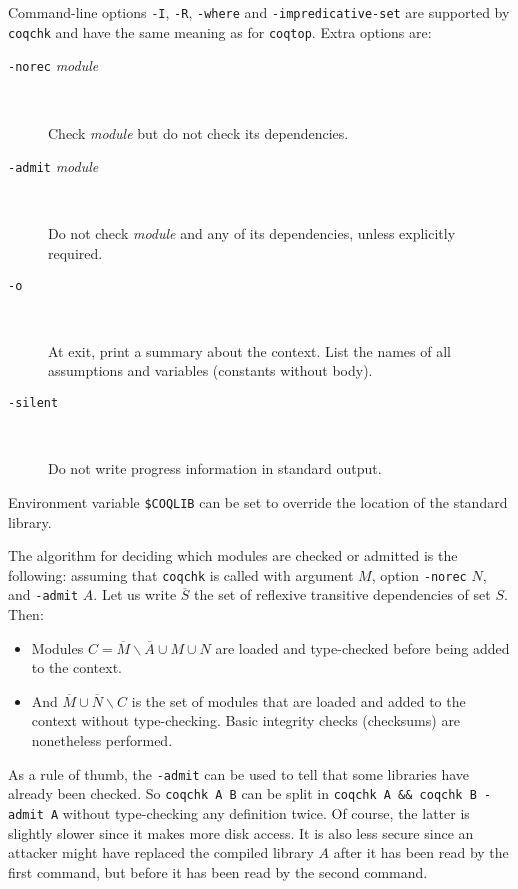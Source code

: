 Command-line options {\tt -I}, {\tt -R}, {\tt -where} and
{\tt -impredicative-set} are supported by {\tt coqchk} and have the
same meaning as for {\tt coqtop}. Extra options are:
\begin{description}
\item[{\tt -norec} {\em module}]\ %

  Check {\em module} but do not check its dependencies.

\item[{\tt -admit} {\em module}]\ %

  Do not check {\em module} and any of its dependencies, unless
  explicitly required.

\item[{\tt -o}]\ %

  At exit, print a summary about the context. List the names of all
  assumptions and variables (constants without body).

\item[{\tt -silent}]\ %

  Do not write progress information in standard output.
\end{description}

Environment variable \verb:$COQLIB: can be set to override the
location of the standard library.

The algorithm for deciding which modules are checked or admitted is
the following: assuming that {\tt coqchk} is called with argument $M$,
option {\tt -norec} $N$, and {\tt -admit} $A$. Let us write
$\overline{S}$ the set of reflexive transitive dependencies of set
$S$. Then:
\begin{itemize}
\item Modules $C=\overline{M}\backslash\overline{A}\cup M\cup N$ are
  loaded and type-checked before being added to the context.
\item And $\overline{M}\cup\overline{N}\backslash C$ is the set of
  modules that are loaded and added to the context without
  type-checking. Basic integrity checks (checksums) are nonetheless
  performed.
\end{itemize}

As a rule of thumb, the {\tt -admit} can be used to tell that some
libraries have already been checked. So {\tt coqchk A B} can be split
in {\tt coqchk A \&\& coqchk B -admit A} without type-checking any
definition twice. Of course, the latter is slightly slower since it
makes more disk access. It is also less secure since an attacker might
have replaced the compiled library $A$ after it has been read by the
first command, but before it has been read by the second command.


